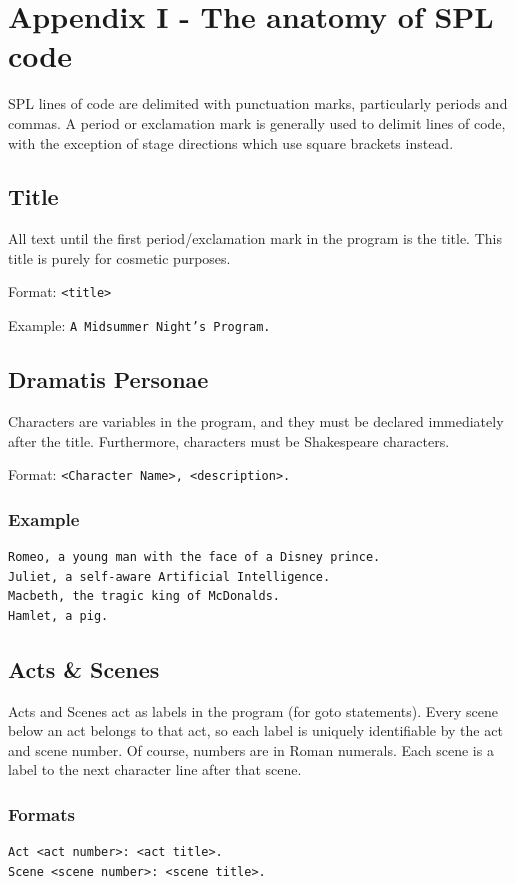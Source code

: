 \documentclass[11pt]{article}
\begin{document}
\section{Appendix I - The anatomy of SPL code}
SPL lines of code are delimited with punctuation marks, particularly periods and commas. A period or exclamation mark is generally used to delimit lines of code, with the exception of stage directions which use square brackets instead.

\subsection{Title}
All text until the first period/exclamation mark in the program is the title. This title is purely for cosmetic purposes.

Format: \verb|<title>|

Example: \verb|A Midsummer Night’s Program.|

\subsection{Dramatis Personae}
Characters are variables in the program, and they must be declared immediately after the title. Furthermore, characters must be Shakespeare characters.

Format: \verb|<Character Name>, <description>.|

\subsubsection{Example}
\begin{verbatim}
Romeo, a young man with the face of a Disney prince.
Juliet, a self-aware Artificial Intelligence.
Macbeth, the tragic king of McDonalds.
Hamlet, a pig.
\end{verbatim}

\subsection{Acts \& Scenes}
Acts and Scenes act as labels in the program (for goto statements). Every scene below an act belongs to that act, so each label is uniquely identifiable by the act and scene number. Of course, numbers are in Roman numerals. Each scene is a label to the next character line after that scene.

\subsubsection{Formats}
\begin{verbatim}
Act <act number>: <act title>.
Scene <scene number>: <scene title>.
\end{verbatim}
\end{document}

